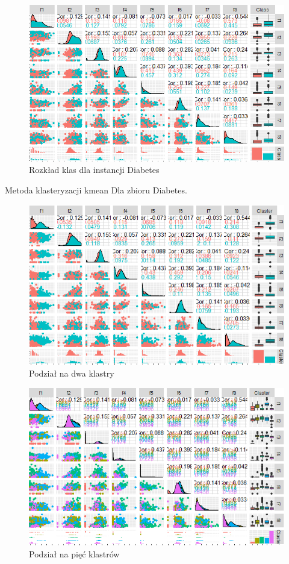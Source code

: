 \documentclass[12pt,a4paper]{article}
\begin{document}
\begin{figure}[H]
\centering
\includegraphics[width=1\textwidth]{diabetesClasses.PNG}
\caption{Rozkład klas dla instancji Diabetes}
\end{figure}

Metoda klasteryzacji kmean Dla zbioru Diabetes.

\begin{figure}[H]
\centering
\includegraphics[width=1\textwidth]{diabetesK2.PNG}
\caption{Podział na dwa klastry}
\end{figure}

\begin{figure}[H]
\centering
\includegraphics[width=1\textwidth]{diabetesK5.PNG}
\caption{Podział na pięć klastrów}
\end{figure}
\end{document}
